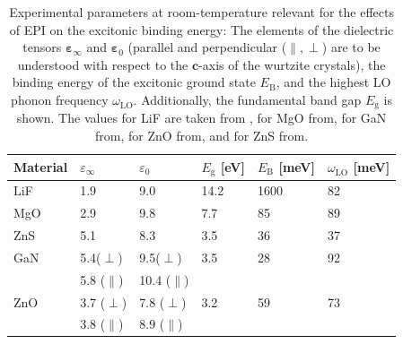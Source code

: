 \begin{table}[t]
\captionsetup{format=plain}
\caption[Experimental parameters at room-temperature relevant for the effects of EPI on the excitonic binding energy.]{Experimental parameters at room-temperature relevant for the effects of EPI on the excitonic binding energy: The elements of the dielectric tensors $\boldsymbol{\varepsilon}_\infty$ and $\boldsymbol{\varepsilon}_0$ (parallel and perpendicular ($\parallel,\perp$) are to be understood with respect to the $\mathbf{c}$-axis of the wurtzite crystals), the binding energy of the excitonic ground state $E_\text{B}^{\phantom{l}}$, and the highest LO phonon frequency $\omega^{\phantom{I}}_\text{LO}$. Additionally, the fundamental band gap $E_\text{g}$ is shown. The values for LiF are taken from \cite{lif_gap,lif_tensor,lif_phonon,low_cost}, for MgO  from\cite{mgo_data}, for  GaN from\cite{REIMANN1998652,gan_data,gan_tensor},  for ZnO  from\cite{zno_data,zno_exc}, and for ZnS from\cite{bechstedt2016many,zns_exc_bind}.\label{table_dynscreen}}
\vspace{1mm}
\centering
\begin{tabularx}{\textwidth}{YYYYYY}
\hline
\hline
\centering
Material & $\varepsilon_\infty$ & $\varepsilon_0$ & $E_\text{g}$ [eV] & $E_\text{B}^{\phantom{l}} $ [meV] & $\omega^{\phantom{I}}_\text{LO}$ [meV]  \\
\hline
LiF & 1.9 & 9.0 & 14.2 & 1600 & 82 \\
MgO & 2.9 & 9.8 & 7.7 & 85 & 89 \\
ZnS & 5.1 & 8.3 & 3.5 & 36 & 37 \\
GaN & 5.4($\perp$) & 9.5($\perp$) & 3.5 & 28 & 92 \\
  & 5.8 ($\parallel$) & 10.4 ($\parallel$)&  &  &  \\
ZnO & 3.7 ($\perp$) & 7.8 ($\perp$) & 3.2 & 59 & 73 \\
& 3.8 ($\parallel$)  & 8.9 ($\parallel$) &  &  &  \\
\hline
\hline
\end{tabularx}
\end{table}
%
